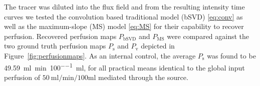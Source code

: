 \documentclass[final,5p,times,twocolumn]{elsarticle}
\begin{document}
	
	The tracer was diluted into the flux field and from the resulting intensity time curves we tested the convolution based traditional model (bSVD) \eqref{eq:conv} as well as the maximum-slope (MS) model \eqref{eq:MS} for their capability to recover perfusion. Recovered perfusion maps $P_{\mathrm{bSVD}}$ and $P_{\mathrm{MS}}$ were compared against the two ground truth perfusion maps $P_{\mathrm{s}}$ and $P_{\mathrm{v}}$ depicted in Figure~\ref{fig:perfusionmaps}. As an internal control, the average $P_{\mathrm{s}}$ was found to be \SI{49.59}{\milli\litre\per\minute\per100\milli\litre}, for all practical means identical to the global input perfusion of $\SI{50}{\milli\litre\per\minute\per100\milli\litre}$ mediated through the source.
	
\end{document}
